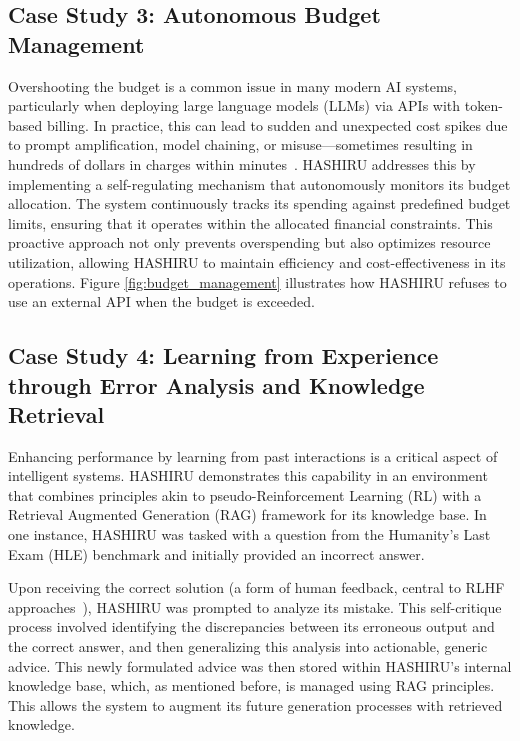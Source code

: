 \documentclass[conference]{IEEEtran}
\begin{document}
\subsection{Case Study 3: Autonomous Budget Management}
\label{sec:casestudy3_budget}
Overshooting the budget is a common issue in many modern AI systems, particularly when deploying large language models (LLMs) via APIs with token-based billing.
In practice, this can lead to sudden and unexpected cost spikes due to prompt amplification, model chaining, or misuse—sometimes resulting in hundreds of dollars in charges within minutes~\cite{gemini_reddit,openai_sos,openai_costs}.
HASHIRU addresses this by implementing a self-regulating mechanism that autonomously monitors its budget allocation.
The system continuously tracks its spending against predefined budget limits, ensuring that it operates within the allocated financial constraints.
This proactive approach not only prevents overspending but also optimizes resource utilization, allowing HASHIRU to maintain efficiency and cost-effectiveness in its operations.
Figure \ref{fig:budget_management} illustrates how HASHIRU refuses to use an external API when the budget is exceeded.

\subsection{Case Study 4: Learning from Experience through Error Analysis and Knowledge Retrieval}
\label{sec:casestudy4_experiential_learning}
Enhancing performance by learning from past interactions is a critical aspect of intelligent systems. HASHIRU demonstrates this capability in an environment that combines principles akin to pseudo-Reinforcement Learning (RL) with a Retrieval Augmented Generation (RAG) framework for its knowledge base. In one instance, HASHIRU was tasked with a question from the Humanity's Last Exam (HLE) benchmark and initially provided an incorrect answer.

Upon receiving the correct solution (a form of human feedback, central to RLHF approaches~\cite{ziegler2019fine,ouyang2022training}), HASHIRU was prompted to analyze its mistake. This self-critique process involved identifying the discrepancies between its erroneous output and the correct answer, and then generalizing this analysis into actionable, generic advice. This newly formulated advice was then stored within HASHIRU's internal knowledge base, which, as mentioned before, is managed using RAG principles. This allows the system to augment its future generation processes with retrieved knowledge.
\end{document}
